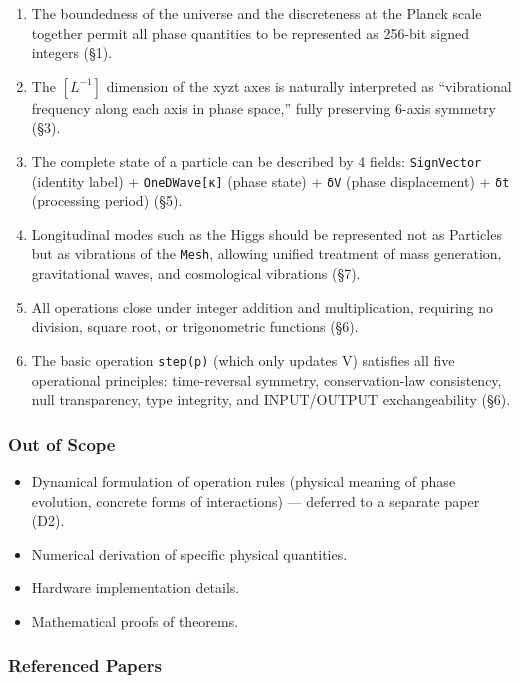 \documentclass[a4paper,11pt]{article}
\providecommand{\tightlist}{\setlength{\itemsep}{0pt}\setlength{\parskip}{0pt}}
\begin{document}
\begin{enumerate}
\def\labelenumi{\arabic{enumi}.}
\tightlist
\item
  The boundedness of the universe and the discreteness at the Planck
  scale together permit all phase quantities to be represented as
  256-bit signed integers (§1).
\item
  The \([L^{-1}]\) dimension of the xyzt axes is naturally interpreted
  as ``vibrational frequency along each axis in phase space,'' fully
  preserving 6-axis symmetry (§3).
\item
  The complete state of a particle can be described by 4 fields:
  \texttt{SignVector} (identity label) + \texttt{OneDWave{[}κ{]}} (phase
  state) + \texttt{δV} (phase displacement) + \texttt{δt} (processing
  period) (§5).
\item
  Longitudinal modes such as the Higgs should be represented not as
  Particles but as vibrations of the \texttt{Mesh}, allowing unified
  treatment of mass generation, gravitational waves, and cosmological
  vibrations (§7).
\item
  All operations close under integer addition and multiplication,
  requiring no division, square root, or trigonometric functions (§6).
\item
  The basic operation \texttt{step(p)} (which only updates V) satisfies
  all five operational principles: time-reversal symmetry,
  conservation-law consistency, null transparency, type integrity, and
  INPUT/OUTPUT exchangeability (§6).
\end{enumerate}

\subsubsection{Out of Scope}\label{out-of-scope}

\begin{itemize}
\tightlist
\item
  Dynamical formulation of operation rules (physical meaning of phase
  evolution, concrete forms of interactions) --- deferred to a separate
  paper (D2).
\item
  Numerical derivation of specific physical quantities.
\item
  Hardware implementation details.
\item
  Mathematical proofs of theorems.
\end{itemize}

\subsubsection{Referenced Papers}\label{referenced-papers}
\end{document}

